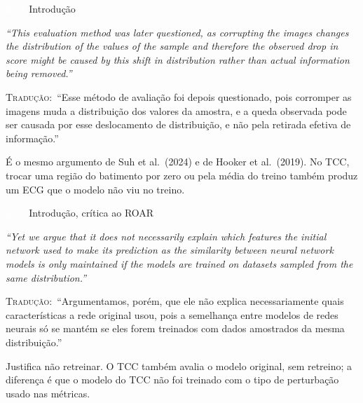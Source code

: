 \documentclass[11pt,a4paper]{article}
\newcommand{\pagechip}[1]{{\setlength{\fboxsep}{1.5pt}\colorbox{cAcc}{\textcolor{white}{\scriptsize\texttt{#1}}}}}
\newenvironment{origquote}{\par\itshape\small}{\par}
\newenvironment{tradquote}{\par\small\textsc{Tradução:}\ }{\par}
\newcommand{\explab}[1]{\par\smallskip{\small\color{cAcc}\textbf{\MakeUppercase{#1}}}\par}
\begin{document}
\begin{citacard}{\pagechip{p. 2} Introdução}
\begin{origquote}“This evaluation method was later questioned, as corrupting the images changes the distribution of the values of the sample and therefore the observed drop in score might be caused by this shift in distribution rather than actual information being removed.”\end{origquote}
\begin{tradquote}“Esse método de avaliação foi depois questionado, pois corromper as imagens muda a distribuição dos valores da amostra, e a queda observada pode ser causada por esse deslocamento de distribuição, e não pela retirada efetiva de informação.”\end{tradquote}
\explab{Explicação}
É o mesmo argumento de Suh et al.\ (2024) e de Hooker et al.\ (2019). No TCC, trocar uma região do batimento por zero ou pela média do treino também produz um ECG que o modelo não viu no treino.
\end{citacard}

\begin{citacard}{\pagechip{p. 2} Introdução, crítica ao ROAR}
\begin{origquote}“Yet we argue that it does not necessarily explain which features the initial network used to make its prediction as the similarity between neural network models is only maintained if the models are trained on datasets sampled from the same distribution.”\end{origquote}
\begin{tradquote}“Argumentamos, porém, que ele não explica necessariamente quais características a rede original usou, pois a semelhança entre modelos de redes neurais só se mantém se eles forem treinados com dados amostrados da mesma distribuição.”\end{tradquote}
\explab{Explicação}
Justifica não retreinar. O TCC também avalia o modelo original, sem retreino; a diferença é que o modelo do TCC não foi treinado com o tipo de perturbação usado nas métricas.
\end{citacard}
\end{document}

